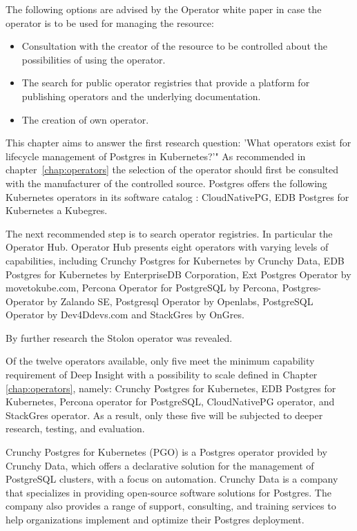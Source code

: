 The following options are advised by the Operator white paper \cite{operatorWhitepaper} in case the operator is to be used for managing the resource:
\begin{itemize}
    \item	Consultation with the creator of the resource to be controlled about the possibilities of using the operator.
    \item	The search for public operator registries that provide a platform for publishing operators and the underlying documentation.
    \item	The creation of own operator.
\end{itemize}

\label{chap:searchForoperators}
This chapter aims to answer the first research question: 'What operators exist for lifecycle management of Postgres in Kubernetes?'"
As recommended in chapter~\ref{chap:operators} the selection of the operator should first be consulted with the manufacturer of the controlled source. Postgres offers the following Kubernetes operators in its software catalog \cite{docuPgSwCatalogue}: CloudNativePG, EDB Postgres for Kubernetes a Kubegres.

The next recommended step is to search operator registries. In particular the Operator Hub. \cite{operatorHubPGSearch} Operator Hub presents eight operators with varying levels of capabilities, including Crunchy Postgres for Kubernetes by Crunchy Data, EDB Postgres for Kubernetes by EnterpriseDB Corporation, Ext Postgres Operator by movetokube.com, Percona Operator for PostgreSQL by Percona, Postgres-Operator by Zalando SE, Postgresql Operator by Openlabs, PostgreSQL Operator by Dev4Ddevs.com and StackGres by OnGres.

By further research the Stolon operator was revealed. \cite{PalarkComparingKubernetes}

Of the twelve operators available, only five meet the minimum capability requirement of Deep Insight with a possibility to scale defined in Chapter \ref{chap:operators}, namely: Crunchy Postgres for Kubernetes, EDB Postgres for Kubernetes, Percona operator for PostgreSQL, CloudNativePG operator, and StackGres operator. As a result, only these five will be subjected to deeper research, testing, and evaluation.

\pagebreak
{}
Crunchy Postgres for Kubernetes (PGO) is a Postgres operator provided by Crunchy Data, which offers a declarative solution for the management of PostgreSQL clusters, with a focus on automation.
Crunchy Data is a company that specializes in providing open-source software solutions for Postgres. The company also provides a range of support, consulting, and training services to help organizations implement and optimize their Postgres deployment. \cite{Crunchy}

